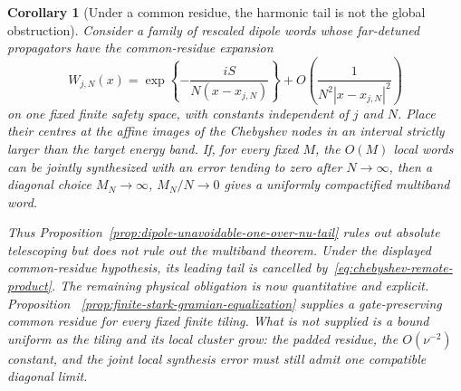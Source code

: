 \documentclass[11pt]{article}
\newtheorem{corollary}[theorem]{Corollary}
\theoremstyle{remark}
\begin{document}
\begin{corollary}[Under a common residue, the harmonic tail is not the global obstruction]
\label{cor:chebyshev-tail-criterion}
Consider a family of rescaled dipole words whose far-detuned propagators have
the common-residue expansion
\[
 W_{j,N}(x)
 =
 \exp\!\left\{
  -\frac{iS}{N(x-x_{j,N})}
 \right\}
 +O\!\left(\frac1{N^2|x-x_{j,N}|^2}\right)
\]
on one fixed finite safety space, with constants independent of $j$ and $N$.
Place their centres at the affine images of the Chebyshev nodes in an interval
strictly larger than the target energy band.  If, for every fixed $M$, the
$O(M)$ local words can be jointly synthesized with an error tending to zero
after $N\to\infty$, then a diagonal choice
$M_N\to\infty$, $M_N/N\to0$ gives a uniformly compactified multiband word.

Thus Proposition~\ref{prop:dipole-unavoidable-one-over-nu-tail} rules out
absolute telescoping but does not rule out the multiband theorem.  Under the
displayed common-residue hypothesis, its leading tail is cancelled
by~\eqref{eq:chebyshev-remote-product}.  The remaining physical obligation is
now quantitative and explicit.  Proposition
~\ref{prop:finite-stark-gramian-equalization} supplies a gate-preserving common
residue for every fixed finite tiling.  What is not supplied is a bound uniform
as the tiling and its local cluster grow: the padded residue, the
$O(\nu^{-2})$ constant, and the joint local synthesis error must still admit
one compatible diagonal limit.
\end{corollary}
\end{document}
